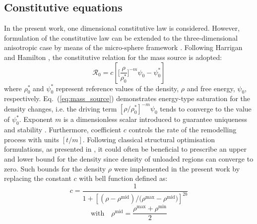 \documentclass[11pt]{acmeArticle}
\numberwithin{equation}{section}
\begin{document}
\subsection{Constitutive equations}
In the present work, one dimensional constitutive law is considered. 
However, formulation of the constitutive law can be extended to the three-dimensional anisotropic case by means of the micro-sphere framework \citep{Waffenschmidt2012}. 
Following Harrigan and Hamilton \citep{Harrigan1993}, the constitutive relation for the mass source is adopted:
\begin{equation}
\mathcal{R}_{0}=c\left[\Biggl[\frac{\rho}{\rho_{0}^{\ast}}\Biggr]^{-m}\psi_{0}-\psi_{0}^{\ast}\right]
\label{eq:mass_source}
\end{equation}
where $\rho_0^\ast$ and $\psi_{0}^\ast$ represent reference values of the density, $\rho$ and free energy, $\psi_0$, respectively.  
Eq.~(\ref{eq:mass_source}) demonstrates energy-type saturation for the density changes, i.e. the driving term $\left[ \rho / \rho_0^\ast \right]^{-m}\psi_0$ tends to converge to the value of $\psi_{0}^\ast$. 
Exponent $m$ is a dimensionless scalar introduced to guarantee uniqueness and stability \citep{Harrigan1993} . 
Furthermore, coefficient $c$ controls the rate of the remodelling process with units $[t/m]$. 
Following classical structural optimisation formulations, as presented in \citep{Waffenschmidt2012}, it could often be beneficial to prescribe an upper and lower bound for the density%
since density of unloaded regions can converge to zero.
Such bounds for the density $\rho$ were implemented in the present work by replacing the constant $c$ with bell function defined as:
\begin{equation*}
c=\frac{1}{1 + \left[  (\rho - \rho^{\mathrm{mid}}) / (\rho{^\mathrm{max}} - \rho{^\mathrm{mid})} \right]^{2 b}}
\end{equation*}
\begin{equation}
\mathrm{with} \quad \rho^{\mathrm{mid}} = \frac{\rho{^\mathrm{max}} + \rho{^\mathrm{min}}}{2}
\label{eq:bell_function}
\end{equation}
\end{document}
